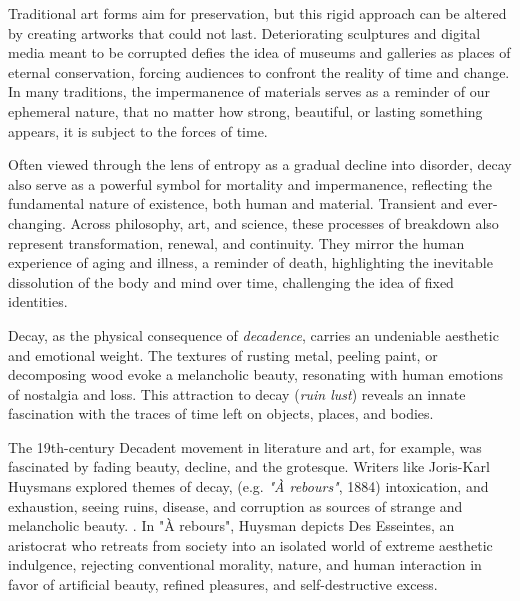Traditional art forms aim for preservation, but this rigid approach can be altered by creating artworks that could not last. Deteriorating sculptures and digital media meant to be corrupted defies the idea of museums and galleries as places of eternal conservation, forcing audiences to confront the reality of time and change. In many traditions, the impermanence of materials serves as a reminder of our ephemeral nature, that no matter how strong, beautiful, or lasting something appears, it is subject to the forces of time.

Often viewed through the lens of entropy as a gradual decline into disorder, decay also serve as a powerful symbol for mortality and impermanence, reflecting the fundamental nature of existence, both human and material. Transient and ever-changing. Across philosophy, art, and science, these processes of breakdown also represent transformation, renewal, and continuity. They mirror the human experience of aging and illness, a reminder of death, highlighting the inevitable dissolution of the body and mind over time, challenging the idea of fixed identities. 






Decay, as the physical consequence of \textit{decadence}, carries an undeniable aesthetic and emotional weight. The textures of rusting metal, peeling paint, or decomposing wood evoke a melancholic beauty, resonating with human emotions of nostalgia and loss. This attraction to decay (\textit{ruin lust}) reveals an innate fascination with the traces of time left on objects, places, and bodies.

The 19th-century Decadent movement in literature and art, for example, was fascinated by fading beauty, decline, and the grotesque. Writers like Joris-Karl Huysmans explored themes of decay, (e.g. \textit{"À rebours"}, 1884) intoxication, and exhaustion, seeing ruins, disease, and corruption as sources of strange and melancholic beauty. \citep{huysmans1884}. In "À rebours", Huysman depicts Des Esseintes, an aristocrat who retreats from society into an isolated world of extreme aesthetic indulgence, rejecting conventional morality, nature, and human interaction in favor of artificial beauty, refined pleasures, and self-destructive excess. 

